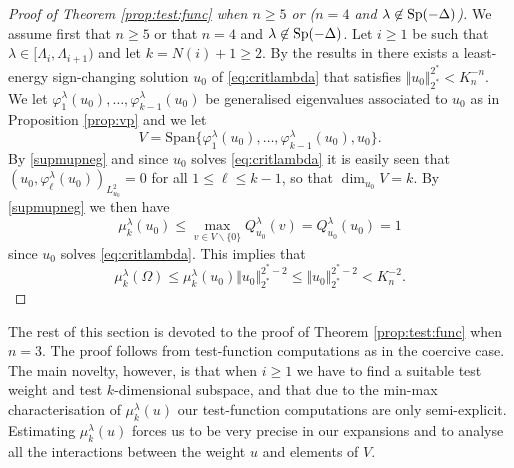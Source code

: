 \documentclass[10pt]{amsart}
\numberwithin{equation}{section}
\newcommand{\Sp}{{\rm Sp}}
\newcommand{\vp}{\varphi}
\newcommand{\Om}{\Omega}
\newcommand{\mkl}{\mu_{k}^{\lambda}}
\theoremstyle{plain}
\theoremstyle{remark}
\begin{document}
\begin{proof}[Proof of Theorem \ref{prop:test:func} when $n \ge 5$ or ($n=4$ and $\lambda \not \in \Sp(-\Delta)$)] 
We assume first that $n \ge 5$ or that $n = 4$ and $\lambda \not \in \Sp(-\Delta)$. Let $i \ge1$ be such that $\lambda \in [\Lambda_i, \Lambda_{i+1})$ and let $k = N(i)+1 \ge 2$. By the results in  \cite{SzulkinWethWillem} there exists a least-energy sign-changing solution $u_0$ of \eqref{eq:critlambda} that satisfies $\Vert u_0 \Vert_{2^*}^{2^*}  <K_n^{-n}$. We let $\vp_1^{\lambda}(u_0), \dots, \vp_{k-1}^{\lambda}(u_0)$ be generalised eigenvalues associated to $u_0$ as in Proposition \ref{prop:vp} and we let
$$ V = \text{Span} \Big \{\vp_1^{\lambda}(u_0), \dots, \vp_{k-1}^{\lambda}(u_0), u_0 \Big\}. $$
By \eqref{supmupneg} and since $u_0$ solves \eqref{eq:critlambda} it is easily seen that $(u_0, \vp_\ell^{\lambda}(u_0) )_{L^2_{u_0}} = 0$ for all $1 \le \ell \le k-1$, so that $\dim_{u_0} V = k$. By \eqref{supmupneg} we then have 
$$ \mkl(u_0) \le \max_{v \in V \backslash \{0\}} Q_{u_0}^{\lambda}(v) = Q_{u_0}^{\lambda}(u_0)  = 1 $$
since $u_0$ solves \eqref{eq:critlambda}. This implies that 
$$\mkl(\Om) \le  \mkl(u_0) \Vert u_0 \Vert_{2^*}^{2^*-2} \le \Vert u_0 \Vert_{2^*}^{2^*-2} <  K_n^{-2}.$$
\end{proof}
The rest of this section is devoted to the proof of Theorem \ref{prop:test:func} when $n=3$. The proof follows from test-function computations as in the coercive case. The main novelty, however, is that when $i \ge 1$ we have to find a suitable test weight and test $k$-dimensional subspace, and that due to the min-max characterisation of $\mkl(u)$ our test-function computations are only semi-explicit. Estimating $\mkl(u)$ forces us to be very precise in our expansions and to analyse all the interactions between the weight $u$ and elements of $V$. 
\medskip
\end{document}
